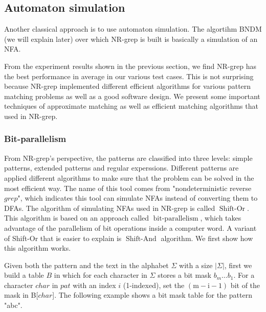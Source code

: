 \subsection{Automaton simulation}
Another classical approach is to use automaton simulation. The algortihm BNDM  (we will explain later) over which NR-grep is built is basically a simulation of an NFA. 

From the experiment results shown in the previous section, we find NR-grep has the best performance in average in our various test cases. This is not surprising because NR-grep implemented different efficient algorithms for various pattern matching problems as well as a good software design. We present some important techniques of approximate matching as well as efficient matching algorithms that used in NR-grep.

\subsubsection{Bit-parallelism}

From NR-grep's perspective, the patterns are classified into three levels: simple patterns, extended patterns and regular experssions. Different patterns are applied  different algorithms to make sure that the problem can be solved in the most efficient way. The name of this tool comes from "nondeterministic reverse $grep$", which indicates this tool can simulate NFAs instead of converting them to DFAs. The algorithm of  simulating NFAs used in NR-grep is called $\operatorname{Shift-Or}$. This algorithm is based on an approach called $\operatorname{bit-parallelism}$, which takes advantage of the parallelism of bit operations inside a computer word. A variant of Shift-Or that is easier to explain is $\operatorname{Shift-And}$ algorithm. We first show how this algorithm works. 

Given both the pattern and the text in the alphabet $\Sigma$ with a size $|\Sigma|$, first we build a table $B$ in which for each character in $\Sigma$ stores a bit mask $b_m...b_1$. For a character $char$ in $pat$ with an index $i$ (1-indexed), set the $\operatorname{(m-i-1)}$ bit of the mask in B[$char$]. The following example shows a bit mask table for the pattern "abc".


